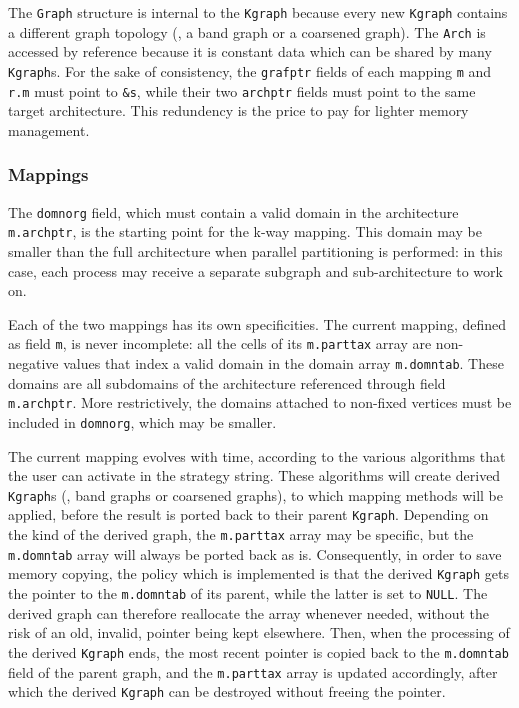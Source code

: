 The \texttt{Graph} structure is internal to the \texttt{Kgraph}
because every new \texttt{Kgraph} contains a different graph topology
(\eg, a band graph or a coarsened graph). The \texttt{Arch} is
accessed by reference because it is constant data which can be shared
by many \texttt{Kgraph}s. For the sake of consistency, the
\texttt{grafptr} fields of each mapping \texttt{m} and \texttt{r.m}
must point to \texttt{\&s}, while their two \texttt{archptr} fields
must point to the same target architecture. This redundency is the
price to pay for lighter memory management.

\subsubsection{Mappings}

The \texttt{domnorg} field, which must contain a valid domain in the
architecture \texttt{m.archptr}, is the starting point for the k-way
mapping. This domain may be smaller than the full architecture when
parallel partitioning is performed: in this case, each process may
receive a separate subgraph and sub-architecture to work on.

Each of the two mappings has its own specificities. The current
mapping, defined as field \texttt{m}, is never incomplete: all the
cells of its \texttt{m.parttax} array are non-negative values that index
a valid domain in the domain array \texttt{m.domntab}. These domains
are all subdomains of the architecture referenced through field
\texttt{m.archptr}. More restrictively, the domains attached to
non-fixed vertices must be included in \texttt{domnorg}, which may be
smaller.

The current mapping evolves with time, according to the various
algorithms that the user can activate in the strategy string. These
algorithms will create derived \texttt{Kgraph}s (\eg, band graphs or
coarsened graphs), to which mapping methods will be applied, before
the result is ported back to their parent \texttt{Kgraph}. Depending
on the kind of the derived graph, the \texttt{m.parttax} array may be
specific, but the \texttt{m.domntab} array will always be ported back
as is. Consequently, in order to save memory copying, the policy which
is implemented is that the derived \texttt{Kgraph} gets the pointer to
the \texttt{m.domntab} of its parent, while the latter is set to
\texttt{NULL}. The derived graph can therefore reallocate the array
whenever needed, without the risk of an old, invalid, pointer being
kept elsewhere. Then, when the processing of the derived
\texttt{Kgraph} ends, the most recent pointer is copied back to the
\texttt{m.domntab} field of the parent graph, and the
\texttt{m.parttax} array is updated accordingly, after which the
derived \texttt{Kgraph} can be destroyed without freeing the
pointer.


